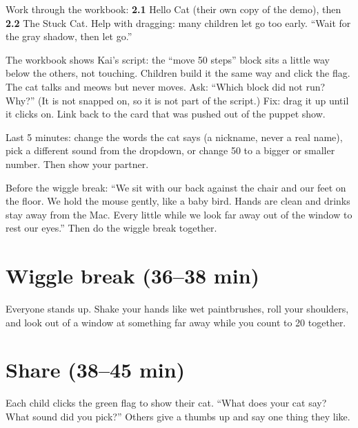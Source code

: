 Work through the workbook: \textbf{2.1} Hello Cat (their own copy of the demo), then \textbf{2.2} The Stuck Cat. Help with dragging: many children let go too early. \enquote{Wait for the gray shadow, then let go.}

\begin{bughunt}
The workbook shows Kai's script: the \enquote{move 50 steps} block sits a little way below the others, not touching. Children build it the same way and click the flag. The cat talks and meows but never moves. Ask: \enquote{Which block did not run? Why?} (It is not snapped on, so it is not part of the script.) Fix: drag it up until it clicks on. Link back to the card that was pushed out of the puppet show.
\end{bughunt}

\begin{freebuild}
Last 5 minutes: change the words the cat says (a nickname, never a real name), pick a different sound from the dropdown, or change 50 to a bigger or smaller number. Then show your partner.
\end{freebuild}

\begin{safety}
Before the wiggle break: \enquote{We sit with our back against the chair and our feet on the floor. We hold the mouse gently, like a baby bird. Hands are clean and drinks stay away from the Mac. Every little while we look far away out of the window to rest our eyes.} Then do the wiggle break together.
\end{safety}

\section{Wiggle break (36--38 min)}
Everyone stands up. Shake your hands like wet paintbrushes, roll your shoulders, and look out of a window at something far away while you count to 20 together.

\section{Share (38--45 min)}
\begin{teacherscript}
Each child clicks the green flag to show their cat. \enquote{What does your cat say? What sound did you pick?} Others give a thumbs up and say one thing they like.
\end{teacherscript}

